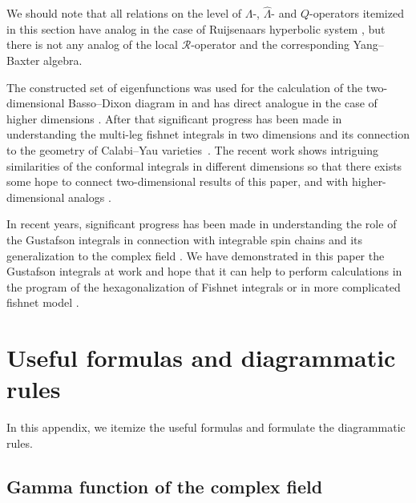 \documentclass[pdftex]{sigma}
\numberwithin{equation}{section}
\begin{document}
We should note that all relations on the level of
$\Lambda$-, $\hat{\Lambda}$- and $Q$-operators itemized in this section
have analog in the case of Ruijsenaars hyperbolic system
\cite{BDKK1,BDKK2,BDKK3,BDKK4}, but there is not any analog
of the local $\mathcal{R}$-operator and the
corresponding Yang--Baxter algebra.

The constructed set of eigenfunctions was used for the calculation of the two-dimensional Basso--Dixon diagram in \cite{DKO} and has direct analogue in the case of higher dimensions \cite{DFO,DO1,DO3,DO2}.
After that significant progress has been made in understanding the
multi-leg fishnet integrals in two dimensions and its connection to the geometry
of Calabi--Yau varieties~\mbox{\cite{Duhr1,Duhr2}}.
The recent work \cite{LS} shows intriguing similarities of the conformal integrals in different dimensions so that there exists some hope to connect two-dimensional results of this paper, \cite{Duhr1,Duhr2} and \cite{DKO} with higher-dimensional analogs \cite{BD,BD1,DFO,DO1,DO2,DO3}.

In recent years, significant progress has been made in understanding the role of the Gustafson integrals \cite{G2,G1,G3} in connection with integrable spin chains
\cite{DM,DMV2,DMV1,M} and its generalization to the complex field \cite{DM,DM3,DMV2,DMV1,MN,N,SS0,SS1,SS2}.
We have demonstrated in this paper the Gustafson integrals
at work and hope that it can help to perform calculations in the program of the
hexagonalization of Fishnet integrals \cite{AO, O1,O2} or in more complicated
fishnet model \cite{AFKO}.




\appendix

\section{Useful formulas and diagrammatic rules}
\label{App-DiagTech}


In this appendix, we itemize the useful formulas and
formulate the diagrammatic rules.

\subsection{Gamma function of the complex field}
\end{document}
